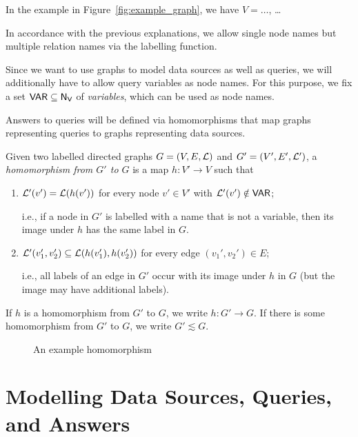 In the example in Figure~\ref{fig:example_graph},
we have $V = \dots$, \dots{}

In accordance with the previous explanations, we allow single node names but multiple relation names
via the labelling function.

Since we want to use graphs to model data sources as well as queries,
we will additionally have to allow query variables as node names.
For this purpose, we fix a set $\mathsf{VAR} \subseteq \mathsf{N}_\mathsf{V}$ of \emph{variables},
which can be used as node names.

Answers to queries will be defined via homomorphisms that map graphs representing queries
to graphs representing data sources.
%
\begin{definition}
  Given two labelled directed graphs $G = (V,E,\mathcal{L})$ and $G' = (V',E',\mathcal{L}')$,
  a \emph{homomorphism from $G'$ to $G$} is a map $h : V' \to V$ such that
  \begin{enumerate}
    \item
      $\mathcal{L}'(v') = \mathcal{L}(h(v'))$ for every node $v' \in V'$ with $\mathcal{L}'(v') \notin \mathsf{VAR}$;
      
      i.e., if a node in $G'$ is labelled with a name that is not a variable,
      then its image under $h$ has the same label in $G$.
    \item
      $\mathcal{L}'(v_1', v_2') \subseteq \mathcal{L}(h(v_1'), h(v_2'))$
      for every edge $(v_1',v_2') \in E$;
      
      i.e., all labels of an edge in $G'$ occur with its image under $h$ in $G$
      (but the image may have additional labels).
  \end{enumerate}
  If $h$ is a homomorphism from $G'$ to $G$, we write $h : G' \to G$.
  If there is some homomorphism from $G'$ to $G$, we write $G' \lesssim G$.
\end{definition}

\begin{figure}
  \caption{An example homomorphism}
  \label{fig:example_hmph}
\end{figure}


\section{Modelling Data Sources, Queries, and Answers}

